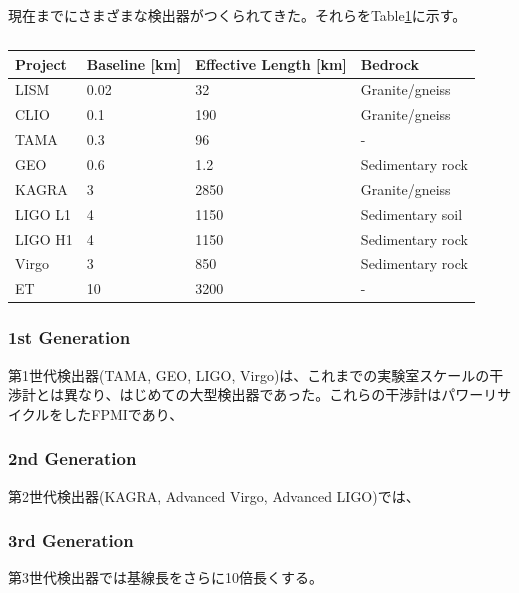 現在までにさまざまな検出器がつくられてきた。それらをTable\ref{tb:tb101}に示す\cite{chen2017brief}。
\begin{table}[h] 
  \begin{center}
    \caption{\cite{chen2017brief,beker2013low}}\label{tb:tb101}
    \begin{tabular}{llll} 
      \hline
      Project & Baseline [km] & Effective Length [km] & Bedrock \\ \hline \hline
      LISM  & 0.02    & 32  & Granite/gneiss \\
      CLIO  & 0.1   & 190 & Granite/gneiss \\
      TAMA  & 0.3   & 96  & - \\ 
      GEO   & 0.6   & 1.2 & Sedimentary rock \\
      KAGRA   & 3  & 2850  & Granite/gneiss \\
      LIGO L1 & 4  & 1150  & Sedimentary soil \\
      LIGO H1 & 4  & 1150  & Sedimentary rock \\
      Virgo   & 3  & 850   & Sedimentary rock \\
      ET      & 10 & 3200  & - \\
      \hline
    \end{tabular}
  \end{center}
\end{table}


\subsubsection{1st Generation}
第1世代検出器(TAMA\cite{ando2001stable}, GEO\cite{grote2010geo}, LIGO\cite{abbott2009ligo}, Virgo\cite{accadia2012virgo})は、これまでの実験室スケールの干渉計とは異なり、はじめての大型検出器であった。これらの干渉計はパワーリサイクルをしたFPMIであり、

\subsubsection{2nd Generation}
第2世代検出器(KAGRA\cite{akutsu2018kagra}, Advanced Virgo\cite{acernese2014advanced}, Advanced LIGO\cite{aasi2015advanced})では、

\subsubsection{3rd Generation}
第3世代検出器では基線長をさらに10倍長くする。


